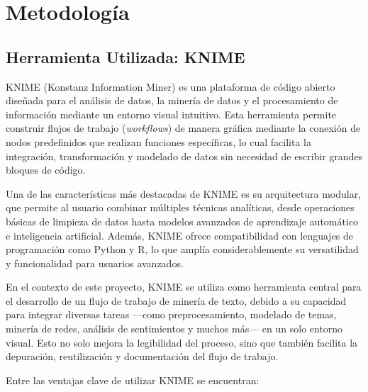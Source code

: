 \section{Metodología}


\subsection{Herramienta Utilizada: KNIME}

KNIME (Konstanz Information Miner) es una plataforma de código abierto diseñada para el análisis de datos, la minería de datos y el procesamiento de información mediante un entorno visual intuitivo. Esta herramienta permite construir flujos de trabajo (\textit{workflows}) de manera gráfica mediante la conexión de nodos predefinidos que realizan funciones específicas, lo cual facilita la integración, transformación y modelado de datos sin necesidad de escribir grandes bloques de código.

Una de las características más destacadas de KNIME es su arquitectura modular, que permite al usuario combinar múltiples técnicas analíticas, desde operaciones básicas de limpieza de datos hasta modelos avanzados de aprendizaje automático e inteligencia artificial. Además, KNIME ofrece compatibilidad con lenguajes de programación como Python y R, lo que amplía considerablemente su versatilidad y funcionalidad para usuarios avanzados.

En el contexto de este proyecto, KNIME se utiliza como herramienta central para el desarrollo de un flujo de trabajo de minería de texto, debido a su capacidad para integrar diversas tareas —como preprocesamiento, modelado de temas, minería de redes, análisis de sentimientos y muchos más— en un solo entorno visual. Esto no solo mejora la legibilidad del proceso, sino que también facilita la depuración, reutilización y documentación del flujo de trabajo.

Entre las ventajas clave de utilizar KNIME se encuentran:

